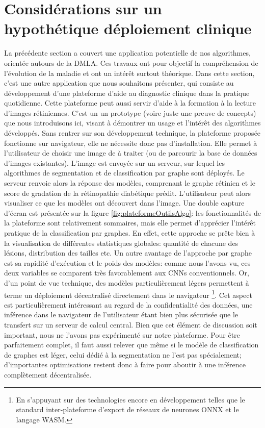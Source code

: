 \section{Considérations sur un hypothétique déploiement clinique}
La précédente section a couvert une application potentielle de nos algorithmes, orientée autours de la DMLA. Ces travaux ont pour objectif la compréhension de l'évolution de la maladie et ont un intérêt surtout théorique. Dans cette section, c'est une autre application que nous souhaitons présenter, qui consiste au développement d'une plateforme d'aide au diagnostic clinique dans la pratique quotidienne. Cette plateforme peut aussi servir d'aide à la formation à la lecture d'images rétiniennes. C'est un un prototype (voire juste une preuve de concepts) que nous introduisons ici, visant à démontrer un usage et l'intérêt des algorithmes développés. Sans rentrer sur son développement technique, la plateforme proposée fonctionne sur navigateur, elle ne nécessite donc pas d'installation. Elle permet à l'utilisateur de choisir une image de \fundus{} à traiter (ou de parcourir la base de données d'images existantes). L'image est envoyée sur un serveur, sur lequel les algorithmes de segmentation et de classification par graphe sont déployés. Le serveur renvoie alors la réponse des modèles, comprenant le graphe rétinien et le score de gradation de la rétinopathie diabétique prédit. L'utilisateur peut alors visualiser ce que les modèles ont découvert dans l'image. Une double capture d'écran est présentée sur la figure \ref{fig:plateformeOutilsAlgo}: les fonctionnalités de la plateforme sont relativement sommaires, mais elle permet d'apprécier l'intérêt pratique de la classification par graphes. En effet, cette approche se prête bien à la visualisation de différentes statistiques globales: quantité de chacune des lésions, distribution des tailles etc. Un autre avantage de l'approche par graphe est sa rapidité d'exécution et le poids des modèles: comme nous l'avons vu, ces deux variables se comparent très favorablement aux CNNs conventionnels. Or, d'un point de vue technique, des modèles particulièrement légers permettent à terme un déploiement décentralisé directement dans le navigateur \footnote{En s'appuyant sur des technologies encore en développement telles que le standard inter-plateforme d'export de réseaux de neurones ONNX et le langage WASM.}. Cet aspect est particulièrement intéressant au regard de la confidentialité des données, une inférence dans le navigateur de l'utilisateur étant bien plus sécurisée que le transfert sur un serveur de calcul central. Bien que cet élément de discussion soit important, nous ne l'avons pas expérimenté sur notre plateforme. Pour être parfaitement complet, il faut aussi relever que même si le modèle de classification de graphes est léger, celui dédié à la segmentation ne l'est pas spécialement; d'importantes optimisations restent donc à faire pour aboutir à une inférence complètement décentralisée.
